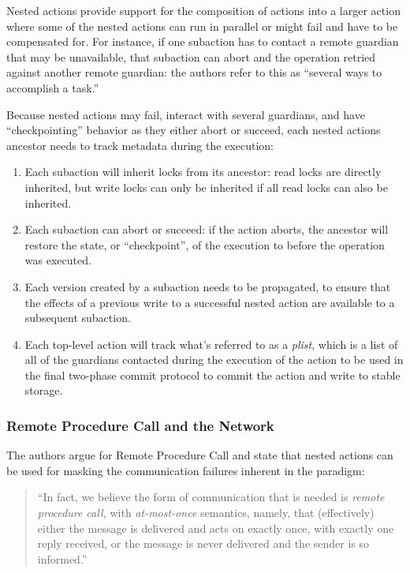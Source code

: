Nested actions provide support for the composition of actions into a larger action where some of the nested actions can run in parallel or might fail and have to be compensated for.  For instance, if one subaction has to contact a remote guardian that may be unavailable, that subaction can abort and the operation retried against another remote guardian: the authors refer to this as ``several ways to accomplish a task.''

Because nested actions may fail, interact with several guardians, and have ``checkpointing'' behavior as they either abort or succeed, each nested actions ancestor needs to track metadata during the execution:

\begin{enumerate}
\item Each subaction will inherit locks from its ancestor: read locks are directly inherited, but write locks can only be inherited if all read locks can also be inherited.
\item Each subaction can abort or succeed: if the action aborts, the ancestor will restore the state, or ``checkpoint'', of the execution to before the operation was executed.	
\item Each version created by a subaction needs to be propagated, to ensure that the effects of a previous write to a successful nested action are available to a subsequent subaction.
\item Each top-level action will track what's referred to as a \textit{plist}, which is a list of all of the guardians contacted during the execution of the action to be used in the final two-phase commit protocol to commit the action and write to stable storage.
\end{enumerate}

\subsubsection{Remote Procedure Call and the Network}

The authors argue for Remote Procedure Call and state that nested actions can be used for masking the communication failures inherent in the paradigm:

\begin{quote}
``In fact, we believe the form of communication that is needed is \textit{remote procedure call,} with \textit{at-most-once} semantics, namely, that (effectively) either the message is delivered and acts on exactly once, with exactly one reply received, or the message is never delivered and the sender is so informed.''	
\end{quote}

